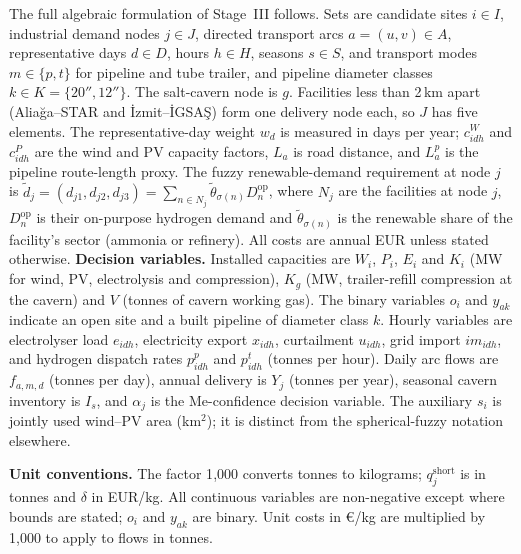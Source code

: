 \documentclass[11pt,a4paper]{article}
\begin{document}
The full algebraic formulation of Stage~III follows. Sets are candidate sites $i\in I$,
industrial demand nodes $j\in J$, directed transport arcs $a=(u,v)\in A$,
representative days $d\in D$, hours $h\in H$, seasons $s\in S$, and transport
modes $m\in\{p,t\}$ for pipeline and tube trailer, and pipeline diameter classes
$k\in K=\{20'',12''\}$. The salt-cavern node is $g$. Facilities less than 2\,km apart
(Aliağa--STAR and İzmit--İGSAŞ) form one delivery node each, so $J$ has five elements. The representative-day weight $w_d$ is measured in days per year;
$c^W_{idh}$ and $c^P_{idh}$ are the wind and PV capacity factors, $L_a$ is
road distance, and $L^p_a$ is the pipeline route-length proxy. The fuzzy
renewable-demand requirement at node $j$ is
$\tilde d_j=(d_{j1},d_{j2},d_{j3})=\sum_{n\in N_j}\tilde\theta_{\sigma(n)} D_n^{\mathrm{op}}$, where $N_j$
are the facilities at node $j$, $D_n^{\mathrm{op}}$ is their on-purpose hydrogen demand and
$\tilde\theta_{\sigma(n)}$ is the renewable share of the facility's sector (ammonia or refinery). All costs are annual EUR
unless stated otherwise.
\textbf{Decision variables.} Installed capacities are $W_i$, $P_i$, $E_i$
and $K_i$ (MW for wind, PV, electrolysis and compression), $K_g$ (MW, trailer-refill
compression at the cavern) and $V$ (tonnes of cavern working gas). The binary variables $o_i$ and
$y_{ak}$ indicate an open site and a built pipeline of diameter class $k$. Hourly variables are electrolyser load $e_{idh}$,
electricity export $x_{idh}$, curtailment $u_{idh}$, grid import $im_{idh}$,
and hydrogen dispatch rates $p^p_{idh}$ and $p^t_{idh}$ (tonnes per hour).
Daily arc flows are $f_{a,m,d}$ (tonnes per day), annual delivery is $Y_j$
(tonnes per year), seasonal cavern inventory is $I_s$, and $\alpha_j$ is the
Me-confidence decision variable. The auxiliary $s_i$ is jointly used wind--PV
area (km$^2$); it is distinct from the spherical-fuzzy notation elsewhere.

\textbf{Unit conventions.} The factor 1{,}000 converts tonnes to kilograms; $q_j^{\mathrm{short}}$
is in tonnes and $\delta$ in EUR/kg. All continuous variables are non-negative except where bounds are stated;
$o_i$ and $y_{ak}$ are binary. Unit costs in €/kg are multiplied by 1{,}000 to apply to flows in tonnes.
\end{document}
